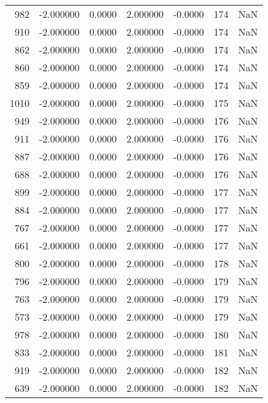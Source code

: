 \begin{tabular}{rrrrrrr}
 982 &   -2.000000 &    0.0000 &    2.000000 &     -0.0000 &         174 & NaN \\
 910 &   -2.000000 &    0.0000 &    2.000000 &     -0.0000 &         174 & NaN \\
 862 &   -2.000000 &    0.0000 &    2.000000 &     -0.0000 &         174 & NaN \\
 860 &   -2.000000 &    0.0000 &    2.000000 &     -0.0000 &         174 & NaN \\
 859 &   -2.000000 &    0.0000 &    2.000000 &     -0.0000 &         174 & NaN \\
1010 &   -2.000000 &    0.0000 &    2.000000 &     -0.0000 &         175 & NaN \\
 949 &   -2.000000 &    0.0000 &    2.000000 &     -0.0000 &         176 & NaN \\
 911 &   -2.000000 &    0.0000 &    2.000000 &     -0.0000 &         176 & NaN \\
 887 &   -2.000000 &    0.0000 &    2.000000 &     -0.0000 &         176 & NaN \\
 688 &   -2.000000 &    0.0000 &    2.000000 &     -0.0000 &         176 & NaN \\
 899 &   -2.000000 &    0.0000 &    2.000000 &     -0.0000 &         177 & NaN \\
 884 &   -2.000000 &    0.0000 &    2.000000 &     -0.0000 &         177 & NaN \\
 767 &   -2.000000 &    0.0000 &    2.000000 &     -0.0000 &         177 & NaN \\
 661 &   -2.000000 &    0.0000 &    2.000000 &     -0.0000 &         177 & NaN \\
 800 &   -2.000000 &    0.0000 &    2.000000 &     -0.0000 &         178 & NaN \\
 796 &   -2.000000 &    0.0000 &    2.000000 &     -0.0000 &         179 & NaN \\
 763 &   -2.000000 &    0.0000 &    2.000000 &     -0.0000 &         179 & NaN \\
 573 &   -2.000000 &    0.0000 &    2.000000 &     -0.0000 &         179 & NaN \\
 978 &   -2.000000 &    0.0000 &    2.000000 &     -0.0000 &         180 & NaN \\
 833 &   -2.000000 &    0.0000 &    2.000000 &     -0.0000 &         181 & NaN \\
 919 &   -2.000000 &    0.0000 &    2.000000 &     -0.0000 &         182 & NaN \\
 639 &   -2.000000 &    0.0000 &    2.000000 &     -0.0000 &         182 & NaN \\

\end{tabular}
